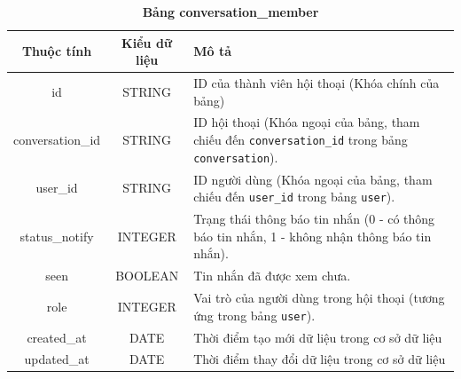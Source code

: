 \begin{table}[H]
  \caption{\bfseries \fontsize{12pt}{0pt}\selectfont Bảng conversation\_member}
  \centering
  \begin{tabularx}{0.9\textwidth}{|c|c|X|}
    \hline
    \textbf{Thuộc tính} & \textbf{Kiểu dữ liệu} & \textbf{Mô tả} \\
    \hline
    id & STRING & ID của thành viên hội thoại (Khóa chính của bảng)\\
    \hline
    conversation\_id & STRING & ID hội thoại (Khóa ngoại của bảng, tham chiếu đến \texttt{conversation\_id} trong bảng \texttt{conversation}). \\
    \hline
    user\_id & STRING & ID người dùng (Khóa ngoại của bảng, tham chiếu đến \texttt{user\_id} trong bảng \texttt{user}). \\
    \hline
    status\_notify & INTEGER & Trạng thái thông báo tin nhắn (0 - có thông báo tin nhắn, 1 - không nhận thông báo tin nhắn).\\
    \hline
    seen & BOOLEAN & Tin nhắn đã được xem chưa.\\
    \hline
    role & INTEGER & Vai trò của người dùng trong hội thoại (tương ứng trong bảng \texttt{user}).\\
    \hline
    created\_at & DATE & Thời điểm tạo mới dữ liệu trong cơ sở dữ liệu \\
    \hline
    updated\_at & DATE & Thời điểm thay đổi dữ liệu trong cơ sở dữ liệu \\
    \hline
  \end{tabularx}
\end{table}


